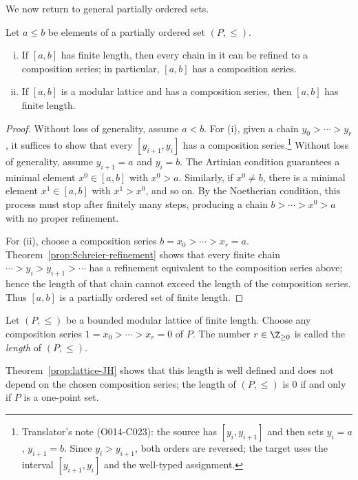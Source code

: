 We now return to general partially ordered sets.

\begin{lemma}\label{prop:lattice-composition-series}
	Let $a\leq b$ be elements of a partially ordered set $(P,\leq)$.
	\begin{enumerate}[(i)]
		\item If $[a,b]$ has finite length, then every chain in it can be refined
		to a composition series; in particular, $[a,b]$ has a composition series.
		\item If $[a,b]$ is a modular lattice and has a composition series, then
		$[a,b]$ has finite length.
	\end{enumerate}
\end{lemma}
\begin{proof}
	Without loss of generality, assume $a<b$. For (i), given a chain
	$y_0>\cdots>y_r$, it suffices to show that every $[y_{i+1},y_i]$ has a
	composition series.\footnote{Translator's note (O014-C023): the source has
	$[y_i,y_{i+1}]$ and then sets $y_i=a$, $y_{i+1}=b$. Since
	$y_i>y_{i+1}$, both orders are reversed; the target uses the interval
	$[y_{i+1},y_i]$ and the well-typed assignment.} Without loss of generality,
	assume $y_{i+1}=a$ and $y_i=b$. The Artinian condition guarantees a minimal
	element $x^0\in[a,b]$ with $x^0>a$. Similarly, if $x^0\neq b$, there is a
	minimal element $x^1\in[a,b]$ with $x^1>x^0$, and so on. By the Noetherian
	condition, this process must stop after finitely many steps, producing a
	chain $b>\cdots>x^0>a$ with no proper refinement.

	For (ii), choose a composition series $b=x_0>\cdots>x_r=a$.
	Theorem~\ref{prop:Schreier-refinement} shows that every finite chain
	$\cdots>y_i>y_{i+1}>\cdots$ has a refinement equivalent to the composition
	series above; hence the length of that chain cannot exceed the length of the
	composition series. Thus $[a,b]$ is a partially ordered set of finite
	length.
\end{proof}

\begin{definition}\label{def:lattice-length}
	Let $(P,\leq)$ be a bounded modular lattice of finite length. Choose any
	composition series $1=x_0>\cdots>x_r=0$ of $P$. The number
	$r\in\Z_{\geq0}$ is called the \emph{length} of $(P,\leq)$.
\end{definition}

Theorem~\ref{prop:lattice-JH} shows that this length is well defined and does
not depend on the chosen composition series; the length of $(P,\leq)$ is $0$
if and only if $P$ is a one-point set.

